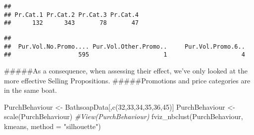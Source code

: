 \documentclass[
]{article}
\newenvironment{Shaded}{\begin{snugshade}}{\end{snugshade}}
\newcommand{\AttributeTok}[1]{\textcolor[rgb]{0.77,0.63,0.00}{#1}}
\newcommand{\CommentTok}[1]{\textcolor[rgb]{0.56,0.35,0.01}{\textit{#1}}}
\newcommand{\DecValTok}[1]{\textcolor[rgb]{0.00,0.00,0.81}{#1}}
\newcommand{\FunctionTok}[1]{\textcolor[rgb]{0.00,0.00,0.00}{#1}}
\newcommand{\NormalTok}[1]{#1}
\newcommand{\OtherTok}[1]{\textcolor[rgb]{0.56,0.35,0.01}{#1}}
\newcommand{\SpecialCharTok}[1]{\textcolor[rgb]{0.00,0.00,0.00}{#1}}
\newcommand{\StringTok}[1]{\textcolor[rgb]{0.31,0.60,0.02}{#1}}
\begin{document}
\begin{Shaded}
\end{Shaded}

\begin{verbatim}
## 
## Pr.Cat.1 Pr.Cat.2 Pr.Cat.3 Pr.Cat.4 
##      132      343       78       47
\end{verbatim}

\begin{Shaded}
\end{Shaded}

\begin{verbatim}
## 
##  Pur.Vol.No.Promo.... Pur.Vol.Other.Promo..     Pur.Vol.Promo.6.. 
##                   595                     1                     4
\end{verbatim}

\#\#\#\#\#As a consequence, when assessing their effect, we've only
looked at the more effective Selling Propositions. \#\#\#\#\#Promotions
and price categories are in the same boat.

\begin{Shaded}
\begin{Highlighting}[]
\NormalTok{PurchBehaviour }\OtherTok{\textless{}{-}}\NormalTok{ BathsoapData[,}\FunctionTok{c}\NormalTok{(}\DecValTok{32}\NormalTok{,}\DecValTok{33}\NormalTok{,}\DecValTok{34}\NormalTok{,}\DecValTok{35}\NormalTok{,}\DecValTok{36}\NormalTok{,}\DecValTok{45}\NormalTok{)]}
\NormalTok{PurchBehaviour }\OtherTok{\textless{}{-}} \FunctionTok{scale}\NormalTok{(PurchBehaviour)}
\CommentTok{\#View(PurchBehaviour)}
\FunctionTok{fviz\_nbclust}\NormalTok{(PurchBehaviour, kmeans, }\AttributeTok{method =} \StringTok{"silhouette"}\NormalTok{)}
\end{Highlighting}
\end{Shaded}
\end{document}
